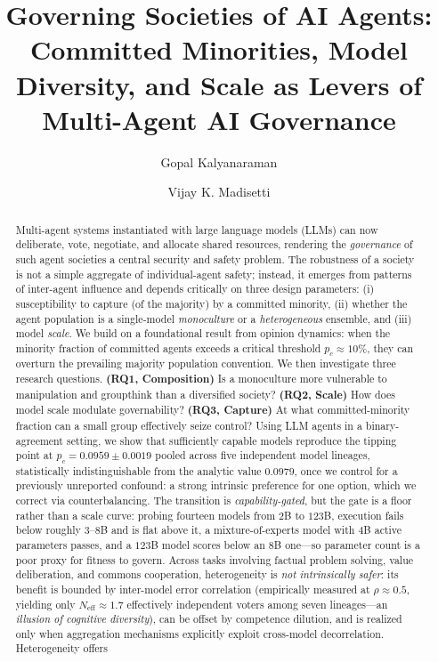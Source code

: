 \documentclass[manuscript,screen,review]{acmart}
\newcommand{\rev}[1]{\textcolor{revblue}{#1}}
\begin{document}
\title{Governing Societies of AI Agents: Committed Minorities, Model Diversity, and Scale as Levers of Multi-Agent AI Governance}

\author{Gopal Kalyanaraman}

\author{Vijay K. Madisetti}

\renewcommand{\shortauthors}{Kalyanaraman and Madisetti}

\begin{abstract}
Multi-agent systems instantiated with large language models (LLMs) can now deliberate, vote, negotiate, and allocate shared resources, rendering the \emph{governance} of such agent societies a central security and safety problem. The robustness of a society is not a simple aggregate of individual-agent safety; instead, it emerges from patterns of inter-agent influence and depends critically on three design parameters: (i) susceptibility to capture (of the majority) by a committed minority, (ii) whether the agent population is a single-model \emph{monoculture} or a \emph{heterogeneous} ensemble, and (iii) model \emph{scale}. We build on a foundational result from opinion dynamics: when the minority fraction of committed agents exceeds a critical threshold $p_c \approx 10\%$, they can overturn the prevailing majority population convention. We then investigate three research questions. \textbf{(RQ1, Composition)} Is a monoculture more vulnerable to manipulation and groupthink than a diversified society? \textbf{(RQ2, Scale)} How does model scale modulate governability? \textbf{(RQ3, Capture)} At what committed-minority fraction can a small group effectively seize control? Using LLM agents in a binary-agreement setting, \rev{we show that sufficiently capable models reproduce the tipping point at $p_c = 0.0959 \pm 0.0019$ pooled across five independent model lineages, statistically indistinguishable from the analytic value $0.0979$}, once we control for a previously unreported confound: a strong intrinsic preference for one option, which we correct via counterbalancing. \rev{The transition is \emph{capability-gated}, but the gate is a floor rather than a scale curve: probing fourteen models from $2$B to $123$B, execution fails below roughly $3$--$8$B and is flat above it, a mixture-of-experts model with $4$B active parameters passes, and a $123$B model scores below an $8$B one---so parameter count is a poor proxy for fitness to govern.} Across tasks involving factual problem solving, value deliberation, and commons cooperation, heterogeneity is \emph{not intrinsically safer}: its benefit is bounded by inter-model error correlation (empirically measured at $\rho \approx 0.5$, yielding only $N_{\mathrm{eff}} \approx 1.7$ effectively independent voters among seven lineages—an \emph{illusion of cognitive diversity}), can be offset by competence dilution, and is realized only when aggregation mechanisms explicitly exploit cross-model decorrelation. Heterogeneity offers 
\end{abstract}
\end{document}
